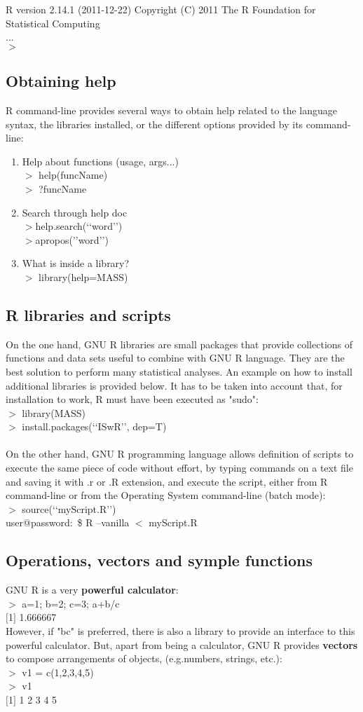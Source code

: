 \documentclass[11pt]{article}
\begin{document}
R version 2.14.1 (2011-12-22)
Copyright (C) 2011 The R Foundation for Statistical Computing\\
...\\
$>$

\subsection{Obtaining help}
R command-line provides several ways to obtain help related to the language syntax, the libraries installed, or the different options provided by its command-line:
\begin{enumerate}
\item{Help about functions (usage, args...)}\\
$>$ help(funcName)\\
$>$ ?funcName
\item{Search through help doc}\\
$>$help.search(‘‘word’’)\\
$>$apropos(’’word’’)
\item{What is inside a library?}\\
$>$ library(help=MASS)
\end{enumerate}
\subsection{R libraries and scripts}
On the one hand, GNU R libraries are small packages that provide collections of functions and data sets useful to combine with GNU R language. They are the best solution to perform many statistical analyses. An example on how to install additional libraries is provided below. It has to be taken into account that, for installation to work, R must have been executed as "sudo":\\
$>$ library(MASS)\\
$>$ install.packages(‘‘ISwR’’, dep=T)\\
\\
On the other hand, GNU R programming language allows definition of scripts to execute the same piece of code without effort, by typing commands on a text file and saving it with .r
or .R extension, and execute the script, either from R command-line or from the Operating System command-line (batch mode):\\
$>$ source(‘‘myScript.R’’)\\
user@password:~\$ R --vanilla $<$ myScript.R
\subsection{Operations, vectors and symple functions}
GNU R is a very \textbf{powerful calculator}:\\
$>$ a=1; b=2; c=3; a+b/c\\
$[$1$]$ 1.666667\\
However, if "bc" is preferred, there is also a library to provide an interface to this powerful calculator. But, apart from being a calculator, GNU R provides \textbf{vectors} to compose arrangements of objects, (e.g.numbers, strings, etc.): \\
$>$ v1 = c(1,2,3,4,5)\\
$>$ v1\\
$[$1$]$ 1 2 3 4 5
\end{document}
